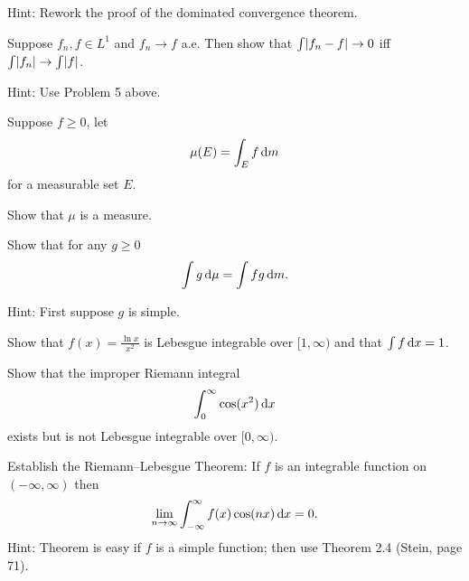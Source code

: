 \documentclass{../homework}
\begin{document}
\begin{problems}
  Hint: Rework the proof of the dominated convergence theorem.

  \begin{solution}
  \end{solution}

\item Suppose \(f_n, f \in L^1\) and \(f_n \to f\) a.e.  Then show
  that \(\int \lvert f_n - f\rvert \to 0\) iff
  \(\int \lvert f_n\rvert \to \int \lvert f\rvert\).

  Hint: Use Problem 5 above.

  \begin{solution}
  \end{solution}

\item Suppose \(f \ge 0\), let
  \[
    \mu(E) = \int_E f \mathop{}\!\mathrm d m
  \]
  for a measurable set \(E\).
  \begin{problems}
  \item Show that \(\mu\) is a measure.

    \begin{solution}
    \end{solution}

  \item Show that for any \(g \ge 0\)
    \[
      \int g \mathop{}\!\mathrm d \mu = \int f g \mathop{}\!\mathrm d m.
    \]

    Hint: First suppose \(g\) is simple.

    \begin{solution}
    \end{solution}

  \end{problems}

\item Show that \(f(x) = \frac{\ln x}{x^2}\) is Lebesgue integrable
  over \([1, \infty)\) and that \(\int f \mathop{}\!\mathrm d x = 1\).

  \begin{solution}
  \end{solution}

\item Show that the improper Riemann integral
  \[
    \int_0^\infty \cos(x^2) \mathop{}\!\mathrm d x
  \]
  exists but is not Lebesgue integrable over \([0, \infty)\).

  \begin{solution}
  \end{solution}

\item Establish the Riemann--Lebesgue Theorem: If \(f\) is an
  integrable function on \((-\infty, \infty)\) then
  \[
    \lim_{n\to\infty} \int_{-\infty}^\infty f(x) \cos(nx) \mathop{}\!\mathrm d x = 0.
  \]
  Hint: Theorem is easy if \(f\) is a simple function; then use
  Theorem 2.4 (Stein, page 71).

  \begin{solution}
  \end{solution}

\end{problems}
\end{document}
